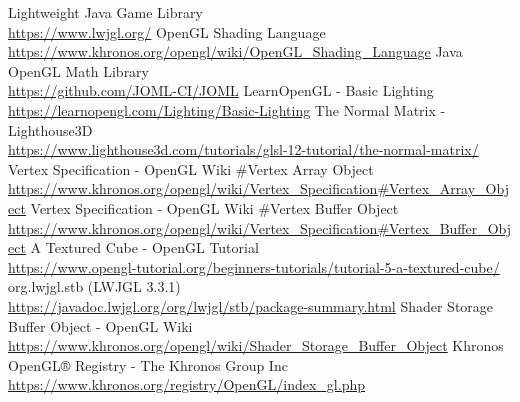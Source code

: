 \documentclass{article}
\begin{document}
    \newpage
    
    \begin{thebibliography}{9}
        
        Lightweight Java Game Library \\
        \url{https://www.lwjgl.org/}
        OpenGL Shading Language \\
        \url{https://www.khronos.org/opengl/wiki/OpenGL_Shading_Language}
        Java OpenGL Math Library \\
        \url{https://github.com/JOML-CI/JOML}
        LearnOpenGL - Basic Lighting \\
        \url{https://learnopengl.com/Lighting/Basic-Lighting}
        The Normal Matrix - Lighthouse3D \\
        \url{https://www.lighthouse3d.com/tutorials/glsl-12-tutorial/the-normal-matrix/}
        Vertex Specification - OpenGL Wiki \#Vertex Array Object \\
        \url{https://www.khronos.org/opengl/wiki/Vertex_Specification#Vertex_Array_Object}
        Vertex Specification - OpenGL Wiki \#Vertex Buffer Object \\
        \url{https://www.khronos.org/opengl/wiki/Vertex_Specification#Vertex_Buffer_Object}
        A Textured Cube - OpenGL Tutorial \\
        \url{https://www.opengl-tutorial.org/beginners-tutorials/tutorial-5-a-textured-cube/}
        org.lwjgl.stb (LWJGL 3.3.1) \\
        \url{https://javadoc.lwjgl.org/org/lwjgl/stb/package-summary.html}
        Shader Storage Buffer Object - OpenGL Wiki \\
        \url{https://www.khronos.org/opengl/wiki/Shader_Storage_Buffer_Object}
        Khronos OpenGL® Registry - The Khronos Group Inc \\
        \url{https://www.khronos.org/registry/OpenGL/index_gl.php}





    \end{thebibliography}
    
\end{document}

